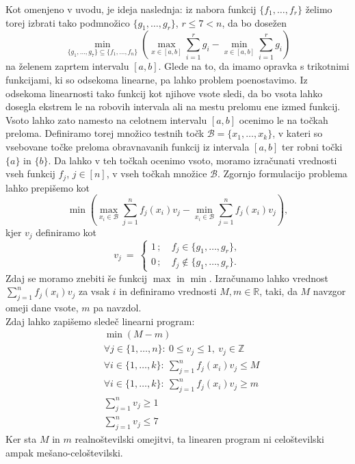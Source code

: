 \documentclass[11pt]{article}
\theoremstyle{definition}
\newcommand{\R}{\mathbb{R}}
\newcommand{\Z}{\mathbb{Z}}
\newcommand{\1}{\mathbbm{1}}
\newcommand{\set}[1]{\{#1\}}
\newcommand{\B}{\mathcal{B}}
\begin{document}
Kot omenjeno v uvodu, je ideja naslednja: iz nabora funkcij $\set{f_1,\ldots,f_r}$ želimo torej izbrati tako podmnožico $\set{g_1,\ldots,g_r}$, $r \leq 7 < n$, da bo dosežen
$$\min_{\set{g_1,\ldots,g_7} \subseteq \set{f_1,\ldots,f_n}}\left({\max_{x \in [a,b]}\sum_{i=1}^r g_i - \min_{x \in [a,b]}\sum_{i=1}^r g_i}\right)$$
na želenem zaprtem intervalu $[a,b]$. Glede na to, da imamo opravka s trikotnimi funkcijami, ki so odsekoma linearne, pa lahko problem poenostavimo. Iz odsekoma linearnosti tako funkcij kot njihove vsote sledi, da bo vsota lahko dosegla ekstrem le na robovih intervala ali na mestu prelomu ene izmed funkcij. Vsoto lahko zato namesto na celotnem intervalu $[a,b]$ ocenimo le na točkah preloma. Definiramo torej množico testnih točk $\mathcal{B} = \set{x_1,\ldots,x_k}$, v kateri so vsebovane točke preloma obravnavanih funkcij iz intervala $[a,b]$ ter robni točki $\set{a}$ in $\set{b}$. Da lahko v teh točkah ocenimo vsoto, moramo izračunati vrednosti vseh funkcij $f_j$, $j \in [n]$, v vseh točkah množice $\B$. Zgornjo formulacijo problema lahko prepišemo kot
$$\min \left( \max_{x_i \in \B} \sum_{j=1}^n f_j(x_i)v_j - \min_{x_i \in \mathcal{B}} \sum_{j=1}^n f_j(x_i)v_j \right),$$
kjer $v_j$ definiramo kot
$$v_j ~=~ \begin{cases}
1\,; ~&f_j \in \set{g_1,\ldots,g_r}, \\
0\,; ~&f_j \notin \set{g_1,\ldots,g_r}.
\end{cases}$$
Zdaj se moramo znebiti še funkcij $\max$ in $\min$. Izračunamo lahko vrednost $\sum_{j=1}^n f_j(x_i)v_j$ za vsak $i$ in definiramo vrednosti $M,m \in \R$, taki, da $M$ navzgor omeji dane vsote, $m$ pa navzdol.\\

Zdaj lahko zapišemo sledeč linearni program:
\begin{align*}
&\min(M-m) \\
&\forall j \in \set{1,\ldots,n}: ~0 \leq v_j \leq 1, ~v_j \in \Z \\
&\forall i \in \set{1,\ldots,k}: ~\sum_{j=1}^n f_j(x_i)v_j \leq M \\
&\forall i \in \set{1,\ldots,k}: ~\sum_{j=1}^n f_j(x_i)v_j \geq m \\
&\sum_{j=1}^n v_j \geq 1 \\
&\sum_{j=1}^n v_j \leq 7
\end{align*}
Ker sta $M$ in $m$ realnoštevilski omejitvi, ta linearen program ni celoštevilski ampak mešano-celoštevilski.

\end{document}
